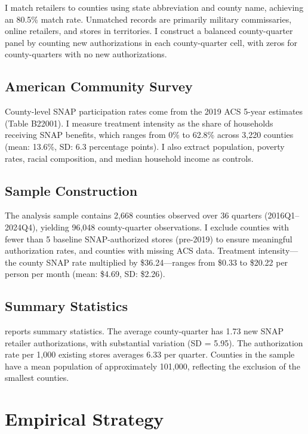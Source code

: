 \documentclass[12pt]{article}
\begin{document}
I match retailers to counties using state abbreviation and county name, achieving an 80.5\% match rate. Unmatched records are primarily military commissaries, online retailers, and stores in territories. I construct a balanced county-quarter panel by counting new authorizations in each county-quarter cell, with zeros for county-quarters with no new authorizations.

\subsection{American Community Survey}

County-level SNAP participation rates come from the 2019 ACS 5-year estimates (Table B22001). I measure treatment intensity as the share of households receiving SNAP benefits, which ranges from 0\% to 62.8\% across 3,220 counties (mean: 13.6\%, SD: 6.3 percentage points). I also extract population, poverty rates, racial composition, and median household income as controls.

\subsection{Sample Construction}

The analysis sample contains 2,668 counties observed over 36 quarters (2016Q1--2024Q4), yielding 96,048 county-quarter observations. I exclude counties with fewer than 5 baseline SNAP-authorized stores (pre-2019) to ensure meaningful authorization rates, and counties with missing ACS data. Treatment intensity---the county SNAP rate multiplied by \$36.24---ranges from \$0.33 to \$20.22 per person per month (mean: \$4.69, SD: \$2.26).

\subsection{Summary Statistics}



 reports summary statistics. The average county-quarter has 1.73 new SNAP retailer authorizations, with substantial variation (SD = 5.95). The authorization rate per 1,000 existing stores averages 6.33 per quarter. Counties in the sample have a mean population of approximately 101,000, reflecting the exclusion of the smallest counties.

\section{Empirical Strategy}
\end{document}
